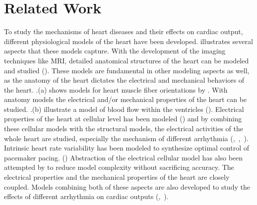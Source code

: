 \section{Related Work}
To study the mechanisms of heart diseases and their effects on cardiac output, different physiological models of the heart have been developed. 
 illustrates several aspects that these models capture. 
With the development of the imaging techniques like MRI, detailed anatomical structures of the heart can be modeled and studied (\cite{geometric}). 
These models are fundamental in other modeling aspects as well, as the anatomy of the heart dictates the electrical and mechanical behaviors of the heart. 
.(a) shows models for heart muscle fiber orientations by \cite{fiber}. 
With anatomy models the electrical and/or mechanical properties of the heart can be studied. 
.(b) illustrate a model of blood flow within the ventricles (\cite{bloodflow}). 
Electrical properties of the heart at cellular level has been modeled (\cite{cellular}) and by combining these cellular models with the structural models, the electrical activities of the whole heart are studied, especially the mechanism of different arrhythmia (\cite{natalia},~\cite{Grosu_MHA},~\cite{Grosu_wave}). 
Intrinsic heart rate variability has been modeled to synthesize optimal control of pacemaker pacing. (\cite{Bogdan}) 
Abstraction of the electrical cellular model has also been attempted by \cite{Grosu_abstract} to reduce model complexity without sacrificing accuracy. 
The electrical properties and the mechanical properties of the heart are closely coupled. 
Models combining both of these aspects are also developed to study the effects of different arrhythmia on cardiac outputs (\cite{natalia},~\cite{eletro_mechanical}).

